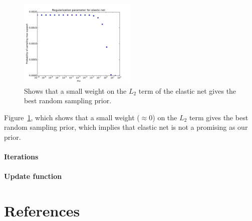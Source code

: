\documentclass{article} %
\begin{document}
\begin{figure}
  \centering
    \includegraphics[width=0.5\textwidth]{figures/regularization_elastic_net.pdf}
  \caption{Shows that a small weight on the $L_2$ term of the elastic net gives the best random sampling prior.}
  \label{regularization-elastic-net}
\end{figure}
Figure~\ref{regularization-elastic-net}, which shows that a small weight ($\approx 0$) on the $L_2$ term gives the best random sampling prior, which implies that elastic net is not a promising as our prior.

\paragraph{Iterations}



\paragraph{Update function}

\section{References}

\FloatBarrier
\vskip 0.2in
\nocite{*}


\end{document}
